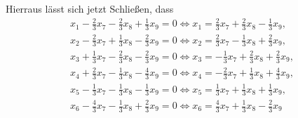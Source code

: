 Hierraus lässt sich jetzt Schließen, dass
\begin{align*}
  x_1 -\frac{2}{3}x_7 - \frac{2}{3}x_8 + \frac{1}{3}x_9 = 0 \Leftrightarrow x_1 = \frac{2}{3}x_7 + \frac{2}{3}x_8 - \frac{1}{3}x_9,    \\
  x_2 -\frac{2}{3}x_7 + \frac{1}{3}x_8 - \frac{2}{3}x_9 = 0 \Leftrightarrow x_2 = \frac{2}{3}x_7 - \frac{1}{3}x_8 + \frac{2}{3}x_9,    \\
  x_3 + \frac{1}{3}x_7 - \frac{2}{3}x_8 - \frac{2}{3}x_9 = 0 \Leftrightarrow x_3 = - \frac{1}{3}x_7 + \frac{2}{3}x_8 + \frac{2}{3}x_9, \\
  x_4 + \frac{2}{3}x_7 - \frac{1}{3}x_8 - \frac{4}{3}x_9 = 0 \Leftrightarrow x_4 = - \frac{2}{3}x_7 + \frac{1}{3}x_8 + \frac{4}{3}x_9, \\
  x_5 -\frac{1}{3}x_7 - \frac{1}{3}x_8 - \frac{1}{3}x_9 = 0 \Leftrightarrow x_5 = \frac{1}{3}x_7 + \frac{1}{3}x_8 + \frac{1}{3}x_9,    \\
  x_6 - \frac{4}{3}x_7 - \frac{1}{3}x_8 + \frac{2}{3}x_9 = 0 \Leftrightarrow x_6 = \frac{4}{3}x_7 + \frac{1}{3}x_8 - \frac{2}{3}x_9
\end{align*}

